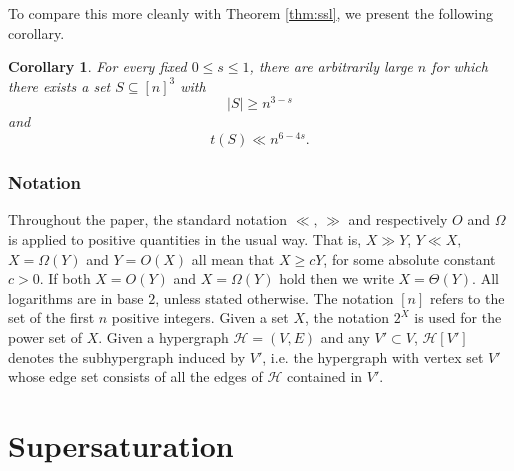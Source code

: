 \documentclass[11pt]{amsart}
\newcommand{\cH}{\mathcal{H}}
\newtheorem{corollary}{Corollary}
\theoremstyle{remark}
\begin{document}
To compare this more cleanly with Theorem \ref{thm:ssl}, we present the following corollary.

\begin{corollary} \label{cor:main}
    For every fixed $0\le s\le 1$, there are arbitrarily large $n$ for which there exists a set $S\subseteq[n]^3$ with
\[
|S|\geq n^{3-s}
\]
and
\[
t(S)\ll n^{6-4s}.
\]
\end{corollary}






 \subsubsection*{Notation}
 
Throughout the paper, the standard notation $\ll, \,\gg$ and respectively $O$ and $\Omega$ is applied to positive quantities in the usual way. That is, $X\gg Y$, $Y \ll X,$ $X=\Omega(Y)$ and $Y=O(X)$ all mean that $X\geq cY$, for some absolute constant $c>0$. If both $X=O(Y)$ and $X= \Omega(Y)$ hold then we write $X= \Theta(Y)$. 
All logarithms are in base $2$, unless stated otherwise. The notation $[n]$ refers to the set of the first $n$ positive integers. Given a set $X$, the notation $2^X$ is used for the power set of $X$. Given a hypergraph $\cH=(V,E)$ and any $V' \subset V$, $\cH[V']$ denotes the subhypergraph induced by $V'$, i.e. the hypergraph with vertex set $V'$ whose edge set consists of all the edges of $\cH$ contained in $V'$.

\section{Supersaturation}
\end{document}
